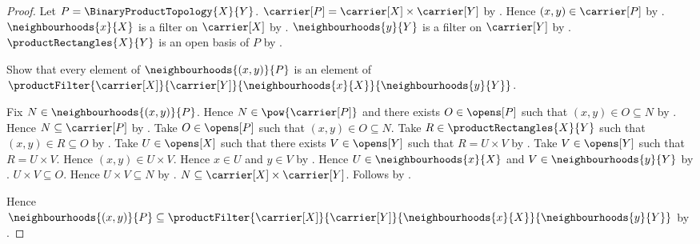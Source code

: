 \begin{proof}
    Let $P=\BinaryProductTopology{X}{Y}$.
    $\carrier[P]=\carrier[X]\times\carrier[Y]$ by
        .
    Hence $(x,y)\in\carrier[P]$ by .
    $\neighbourhoods{x}{X}$ is a filter on $\carrier[X]$ by
        .
    $\neighbourhoods{y}{Y}$ is a filter on $\carrier[Y]$ by
        .
    $\productRectangles{X}{Y}$ is an open basis of $P$ by
        .

    Show that every element of $\neighbourhoods{(x,y)}{P}$ is an
        element of
        $\productFilter{\carrier[X]}{\carrier[Y]}{
            \neighbourhoods{x}{X}}{\neighbourhoods{y}{Y}}$.
    \begin{subproof}
        Fix $N\in\neighbourhoods{(x,y)}{P}$.
        Hence $N\in\pow{\carrier[P]}$ and there exists $O\in\opens[P]$
            such that $(x,y)\in O\subseteq N$ by
            .
        Hence $N\subseteq\carrier[P]$ by .
        Take $O\in\opens[P]$ such that $(x,y)\in O\subseteq N$.
        Take $R\in\productRectangles{X}{Y}$ such that
            $(x,y)\in R\subseteq O$ by .
        Take $U\in\opens[X]$ such that there exists $V\in\opens[Y]$
            such that $R=U\times V$ by .
        Take $V\in\opens[Y]$ such that $R=U\times V$.
        Hence $(x,y)\in U\times V$.
        Hence $x\in U$ and $y\in V$ by .
        Hence $U\in\neighbourhoods{x}{X}$ and
            $V\in\neighbourhoods{y}{Y}$ by
            .
        $U\times V\subseteq O$.
        Hence $U\times V\subseteq N$ by .
        $N\subseteq\carrier[X]\times\carrier[Y]$.
        Follows by .
    \end{subproof}
    Hence $\neighbourhoods{(x,y)}{P}\subseteq
        \productFilter{\carrier[X]}{\carrier[Y]}{
            \neighbourhoods{x}{X}}{\neighbourhoods{y}{Y}}$ by
        .


\end{proof}

